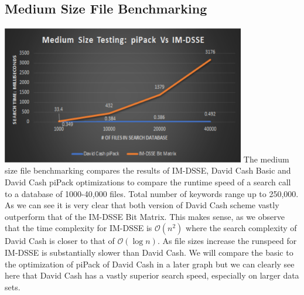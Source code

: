 \newpage
{}


\subsection{Medium Size File Benchmarking}
\includegraphics[width=0.8\textwidth]{Charts/medium_size.eps}
The medium size file benchmarking compares the results of IM-DSSE, David Cash Basic and David Cash piPack optimizations to compare the runtime speed of a search call to a database of 1000-40,000 files. Total number of keywords range up to 250,000. As we can see it is very clear that both version of David Cash scheme vastly outperform that of the IM-DSSE Bit Matrix. This makes sense, as we observe that the time complexity for IM-DSSE is $\mathcal{O} (n^2)$ where the search complexity of David Cash is closer to that of $\mathcal{O} (\log n)$. As file sizes increase the runspeed for IM-DSSE is substantially slower than David Cash. We will compare the basic to the optimization of piPack of David Cash in a later graph but we can clearly see here that David Cash has a vastly superior search speed, especially on larger data sets.

